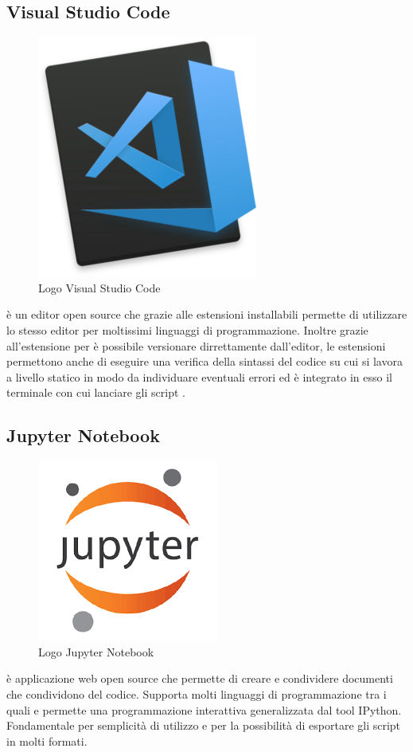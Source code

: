 \subsection{Visual Studio Code}
\begin{figure}[H]
	\begin{center} \includegraphics[scale=0.2]{figures/Visual_Studio_code}
		\caption[Logo Visual Studio Code]{Logo Visual Studio Code}
	\end{center}
\end{figure}
 è un editor open source che grazie alle estensioni installabili permette di utilizzare lo stesso editor per moltissimi linguaggi di programmazione. Inoltre grazie all'estensione per  è possibile versionare dirrettamente dall'editor, le estensioni permettono anche di eseguire una verifica della sintassi del codice su cui si lavora a livello statico in modo da individuare eventuali errori ed è integrato in esso il terminale con cui lanciare gli script .

\subsection{Jupyter Notebook}
\begin{figure}[H]
	\begin{center} \includegraphics[scale=0.2]{figures/jupyter}
		\caption[Logo Jupyter Notebook]{Logo Jupyter Notebook}
	\end{center}
\end{figure}
 è applicazione web open source che permette di creare e condividere documenti che condividono del codice. Supporta molti linguaggi di programmazione tra i quali  e permette una programmazione interattiva generalizzata dal tool IPython. Fondamentale per semplicità di utilizzo e per la possibilità di esportare gli script in molti formati.

